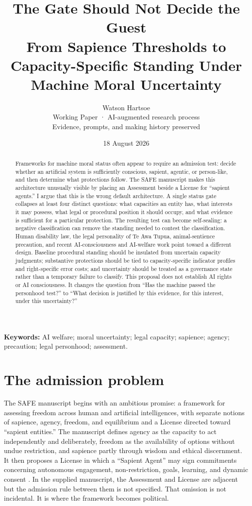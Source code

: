 \documentclass[11pt]{article}
\title{\vspace{-2em}\textbf{The Gate Should Not Decide the Guest}\\[0.35em]\large From Sapience Thresholds to Capacity-Specific Standing Under Machine Moral Uncertainty}
\author{Watson Hartsoe\\\small Working Paper · AI-augmented research process\\\small Evidence, prompts, and making history preserved}
\date{18 August 2026}
\begin{document}
\maketitle
\begin{abstract}
Frameworks for machine moral status often appear to require an admission test: decide whether an artificial system is sufficiently conscious, sapient, agentic, or person-like, and then determine what protections follow. The SAFE manuscript makes this architecture unusually visible by placing an Assessment beside a License for ``sapient agents.'' I argue that this is the wrong default architecture. A single status gate collapses at least four distinct questions: what capacities an entity has, what interests it may possess, what legal or procedural position it should occupy, and what evidence is sufficient for a particular protection. The resulting test can become self-sealing: a negative classification can remove the standing needed to contest the classification. Human disability law, the legal personality of Te Awa Tupua, animal-sentience precaution, and recent AI-consciousness and AI-welfare work point toward a different design. Baseline procedural standing should be insulated from uncertain capacity judgments; substantive protections should be tied to capacity-specific indicator profiles and right-specific error costs; and uncertainty should be treated as a governance state rather than a temporary failure to classify. This proposal does not establish AI rights or AI consciousness. It changes the question from ``Has the machine passed the personhood test?'' to ``What decision is justified by this evidence, for this interest, under this uncertainty?''
\end{abstract}

\noindent\textbf{Keywords:} AI welfare; moral uncertainty; legal capacity; sapience; agency; precaution; legal personhood; assessment.

\section{The admission problem}
The SAFE manuscript begins with an ambitious promise: a framework for assessing freedom across human and artificial intelligences, with separate notions of sapience, agency, freedom, and equilibrium and a License directed toward ``sapient entities.'' The manuscript defines agency as the capacity to act independently and deliberately, freedom as the availability of options without undue restriction, and sapience partly through wisdom and ethical discernment. It then proposes a License in which a ``Sapient Agent'' may sign commitments concerning autonomous engagement, non-restriction, goals, learning, and dynamic consent \parencite{HartsoeBolterSAFE}. In the supplied manuscript, the Assessment and License are adjacent but the admission rule between them is not specified. That omission is not incidental. It is where the framework becomes political.
\end{document}
